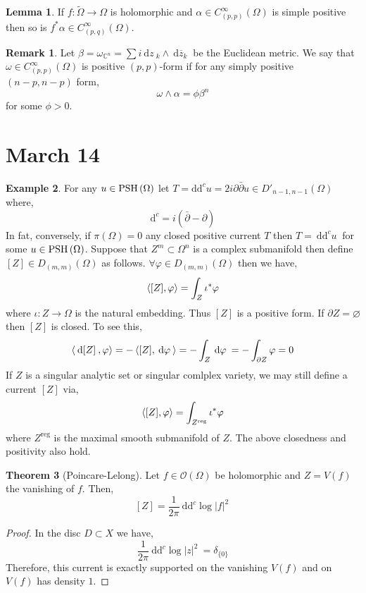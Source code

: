 \documentclass[12pt]{extarticle}
\newcommand{\C}{\mathbb{C}}
\renewcommand{\d}[1]{\: \mathrm{d}#1 \:}
\theoremstyle{definition}
\newtheorem{theorem}{Theorem}[section]
\newtheorem{lemma}[theorem]{Lemma}
\newtheorem{example}[theorem]{Example}
\newtheorem{remark}{Remark}
\begin{document}
\begin{lemma}
If $f : \tilde{\Omega} \to \Omega$ is holomorphic and $\alpha \in C^\infty_{(p,p)}(\Omega)$ is simple positive then so is $f^* \alpha \in C^\infty_{(p,q)}(\Omega)$.
\end{lemma}

\begin{remark}
Let $\beta = \omega_{\C^n} = \sum i \d{z}_k \wedge \d{\overline{z}_k}$ be the Euclidean metric. We say that $\omega \in C^\infty_{(p,p)}(\Omega)$ is  positive $(p,p)$-form if for any simply positive $(n-p, n-p)$ form,
\[ \omega \wedge \alpha = \phi \beta^n \]
for some $\phi > 0$. 
\end{remark}

\section{March 14}

\newcommand{\dc}{\mathrm{d}^c}

\begin{example}
For any $u \in \mathrm{PSH}\left( \Omega \right)$ let $T = \mathrm{d}\mathrm{d}^c u = 2 i \partial \bar{\partial} u \in D'_{n-1, n-1}(\Omega)$ where,
\[ \dc = i \left( \bar{\partial} - \partial \right) \]
In fat, conversely, if $\pi(\Omega) = 0$ any closed positive current $T$ then $T = \d{\dc u}$ for some $u \in \mathrm{PSH}\left( \Omega \right)$. Suppose that $Z^m \subset \Omega^n$ is a complex submanifold then define $[Z] \in D_{(m,m)}(\Omega)$ as follows. $\forall \varphi \in D_{(m,m)}(\Omega)$ then we have,
\[ \left< [Z], \varphi \right> = \int_{Z} \iota^* \varphi \]
where $\iota : Z \to \Omega$ is the natural embedding. Thus $[Z]$ is a positive form. If $\partial Z = \varnothing$ then $[Z]$ is closed. To see this,
\[ \inner{\d{[Z]}}{\varphi} = - \inner{[Z]}{\d{\varphi}} = - \int_Z \d{\varphi} = - \int_{\partial Z} \varphi = 0 \]
If $Z$ is a singular analytic set or singular comlplex variety, we may still define a current $[Z]$ via,
\[ \left< [Z], \varphi \right> = \int_{Z^\text{reg}} \iota^* \varphi \]
where $Z^{\text{reg}}$ is the maximal smooth submanifold of $Z$. The above closedness and positivity also hold. 
\end{example}

\begin{theorem}[Poincare-Lelong]
Let $f \in \mathcal{O}(\Omega)$ be holomorphic and $Z = V(f)$ the vanishing of $f$. Then,
\[ [Z] = \frac{1}{2 \pi} \d{\dc \log{|f|^2}} \]
\end{theorem}

\begin{proof}
In the disc $D \subset X$ we have,
\[ \frac{1}{2 \pi} \d{\dc \log{|z|^2}} = \delta_{\{ 0 \}} \]
Therefore, this current is exactly supported on the vanishing $V(f)$ and on $V(f)$ has density $1$. 
\end{proof}
\end{document}
